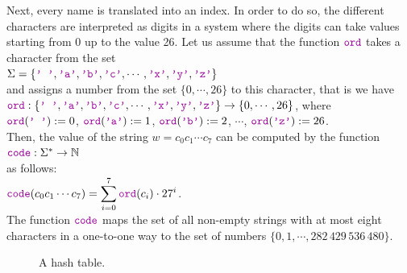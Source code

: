 Next, every name is translated into an index.  In order to do so, the different
characters are interpreted as digits in a system where the digits can take values starting
from 0 up to the value 26.
Let us assume that the function  $\mytt{ord}$ takes a character from the set
\\[0.2cm]
\hspace*{1.3cm}
$\Sigma = \{ \mytt{' '}, \mytt{'a'}, \mytt{'b'}, \mytt{'c'}, \cdots, \mytt{'x'}, \mytt{'y'}, \mytt{'z'} \}$ 
\\[0.2cm]
and assigns a number from the set $\{0,\cdots,26\}$ to this character, that is we have \\[0.2cm]
\hspace*{1.3cm} 
$\mytt{ord}: \{ \mytt{' '}, \mytt{'a'}, \mytt{'b'}, \mytt{'c'}, \cdots, \mytt{'x'}, \mytt{'y'},
\mytt{'z'} \} \rightarrow \{0,\cdots, 26\}$, \quad where
\\[0.2cm]
\hspace*{1.3cm}
$\mytt{ord}(\mytt{' '}) := 0$, \quad
$\mytt{ord}(\mytt{'a'}) := 1$, \quad
$\mytt{ord}(\mytt{'b'}) := 2$, \quad $\cdots$, \quad
$\mytt{ord}(\mytt{'z'}) := 26$.
\\[0.2cm]
Then, the value of the string  $w = c_0c_1\cdots c_7$ can be computed by the function \\[0.2cm]
\hspace*{1.3cm} 
$\mytt{code}: \Sigma^* \rightarrow \mathbb{N}$ \\[0.2cm]
as follows: \\[0.2cm]
\hspace*{1.3cm} 
$\ds \mytt{code}(c_0c_1\cdots c_7) = \sum\limits_{i=0}^7 \mytt{ord}(c_i) \cdot 27^i$.
\\[0.2cm]
The function $\mytt{code}$ maps the set of all non-empty strings with at most eight characters in a
one-to-one way to the set of numbers $\{0,1,\cdots, 282\,429\,536\,480 \}$.


\begin{figure}[!ht]
  \centering
  \caption{A hash table.}
  \label{fig:hash-example}
\end{figure}


